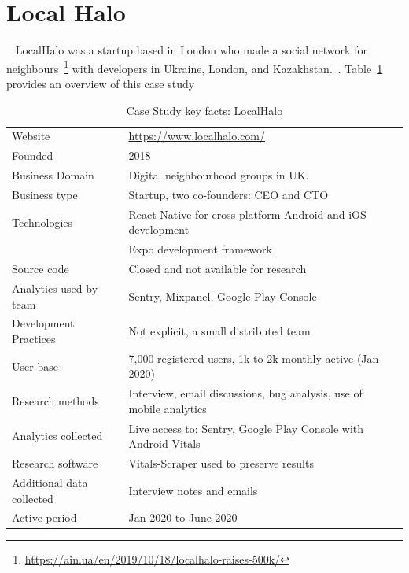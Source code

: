 \section{Local Halo}~\label{study-localhalo}
LocalHalo was a startup based in London who made a social network for neighbours~\footnote{\url{https://ain.ua/en/2019/10/18/localhalo-raises-500k/}} with developers in Ukraine, London, and Kazakhstan.~\citep{karpenko2019_localhalo_a_social_network_for_neighbors}. 
Table~\ref{tab:local_halo_anaytics_overview} provides an overview of this case study

{\renewcommand{\arraystretch}{0.8}%
\begin{table}[htbp!]
    \centering
    \small
    \setlength{\tabcolsep}{1pt}
    \begin{tabular}{ll}
       \toprule
       Website &\url{https://www.localhalo.com/} \\
       Founded &2018 \\
       Business Domain &Digital neighbourhood groups in UK.\\
       Business type &Startup, two co-founders: CEO and CTO \\
       Technologies  &React Native for cross-platform Android and iOS development \\
       &Expo development framework \\
       Source code  &Closed and not available for research \\
       Analytics used by team &Sentry, Mixpanel, Google Play Console \\
       Development Practices &Not explicit, a small distributed team \\
       \midrule
       User base &7,000 registered users, 1k to 2k monthly active (Jan 2020) \\
       \midrule
       Research methods &Interview, email discussions, bug analysis, use of mobile analytics \\
       Analytics collected &Live access to: Sentry, Google Play Console with Android Vitals \\
       Research software &Vitals-Scraper used to preserve results \\
       Additional data collected &Interview notes and emails \\
       Active period &Jan 2020 to June 2020 \\
       \bottomrule
    \end{tabular}
    \caption{Case Study key facts: LocalHalo}
    \label{tab:local_halo_anaytics_overview}
\end{table}
}


